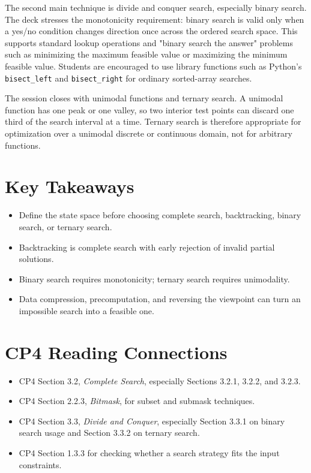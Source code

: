 \documentclass[11pt]{article}
\begin{document}
The second main technique is divide and conquer search, especially binary search. The deck stresses the monotonicity requirement: binary search is valid only when a yes/no condition changes direction once across the ordered search space. This supports standard lookup operations and "binary search the answer" problems such as minimizing the maximum feasible value or maximizing the minimum feasible value. Students are encouraged to use library functions such as Python's \texttt{bisect\_left} and \texttt{bisect\_right} for ordinary sorted-array searches.

The session closes with unimodal functions and ternary search. A unimodal function has one peak or one valley, so two interior test points can discard one third of the search interval at a time. Ternary search is therefore appropriate for optimization over a unimodal discrete or continuous domain, not for arbitrary functions.

\section*{Key Takeaways}
\begin{itemize}
  \item Define the state space before choosing complete search, backtracking, binary search, or ternary search.
  \item Backtracking is complete search with early rejection of invalid partial solutions.
  \item Binary search requires monotonicity; ternary search requires unimodality.
  \item Data compression, precomputation, and reversing the viewpoint can turn an impossible search into a feasible one.
\end{itemize}

\section*{CP4 Reading Connections}
\begin{itemize}
  \item CP4 Section 3.2, \textit{Complete Search}, especially Sections 3.2.1, 3.2.2, and 3.2.3.
  \item CP4 Section 2.2.3, \textit{Bitmask}, for subset and submask techniques.
  \item CP4 Section 3.3, \textit{Divide and Conquer}, especially Section 3.3.1 on binary search usage and Section 3.3.2 on ternary search.
  \item CP4 Section 1.3.3 for checking whether a search strategy fits the input constraints.
\end{itemize}
\end{document}
